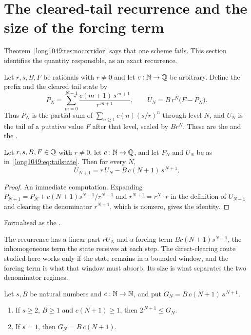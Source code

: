 \documentclass[11pt]{article}
\begin{document}
\section{The cleared-tail recurrence and the size of the forcing
term}\label{long1049:sec:tail}

Theorem~\ref{long1049:res:nocorridor} says that one scheme fails.  This section
identifies the quantity responsible, as an exact recurrence.

Let $r,s,B,F$ be rationals with $r\ne0$ and let $c:\mathbb{N}\to\mathbb{Q}$ be arbitrary.
Define the prefix and the cleared tail state by
\[
 P_N=\sum_{m=0}^{N-1}\frac{c(m+1)\,s^{\,m+1}}{r^{\,m+1}},
 \qquad
 U_N=B\,r^{N}\bigl(F-P_N\bigr).
\tag{$\ast$}\label{long1049:eq:tailstate}
\]
Thus $P_N$ is the partial sum of $\sum_{n\ge1}c(n)(s/r)^{n}$ through level $N$,
and $U_N$ is the tail of a putative value $F$ after that level, scaled by
$Br^{N}$.  These are the
 and the
.

\begin{theorem}\label{long1049:res:tailrec}
Let $r,s,B,F\in\mathbb{Q}$ with $r\ne0$, let $c:\mathbb{N}\to\mathbb{Q}$, and let $P_N$ and $U_N$ be as
in~\eqref{long1049:eq:tailstate}.  Then for every $N$,
\[
 U_{N+1}=r\,U_N-B\,c(N+1)\,s^{\,N+1}.
\]
\end{theorem}

\begin{proof}
An immediate computation.  Expanding
$P_{N+1}=P_N+c(N+1)s^{N+1}/r^{N+1}$ and $r^{N+1}=r^{N}\cdot r$ in the
definition of $U_{N+1}$ and clearing the denominator $r^{N+1}$, which is
nonzero, gives the identity.
\end{proof}

\noindent Formalised as the
.

The recurrence has a linear part $rU_N$ and a forcing term $Bc(N+1)s^{N+1}$,
the inhomogeneous term the state receives at each step.
The direct-clearing route studied here works only if the state remains in a
bounded window, and the forcing term is what that window must absorb.  Its
size is what separates the two denominator regimes.

\begin{theorem}\label{long1049:res:forcing}
Let $s,B$ be natural numbers and $c:\mathbb{N}\to\mathbb{N}$, and put
$G_N=B\,c(N+1)\,s^{\,N+1}$.
\begin{enumerate}
\item If $s\ge2$, $B\ge1$ and $c(N+1)\ge1$, then $2^{\,N+1}\le G_N$.
\item If $s=1$, then $G_N=B\,c(N+1)$.
\end{enumerate}
\end{theorem}
\end{document}
